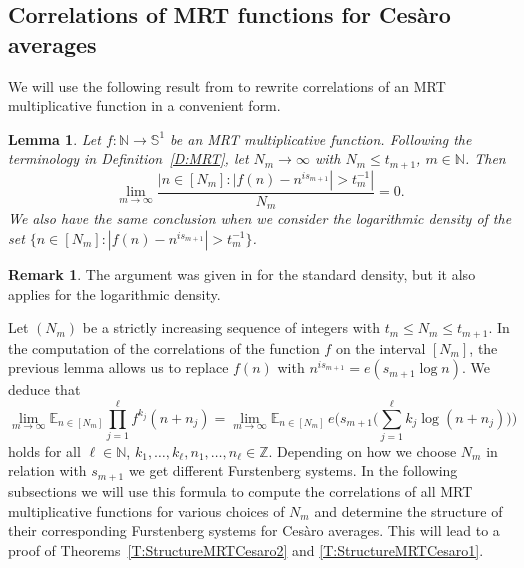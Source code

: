 \documentclass[11pt]{amsart}
\newtheorem{lemma}{Lemma}[section]
\theoremstyle{definition}
\newtheorem*{remark}{Remark}
\newcommand{\E}{{\mathbb E}}
\newcommand{\N}{{\mathbb N}}
\renewcommand{\S}{\mathbb{S}}
\newcommand{\Z}{{\mathbb Z}}
\begin{document}
 	 \subsection{Correlations of MRT functions  for  Ces\`aro averages}\label{SS:Nmsm1}
 	 We will use the following result from
 	 \cite[Lemmas~3.2-3.3]{GLR21} to rewrite correlations of an MRT  multiplicative function in a convenient form.
 	 \begin{lemma}\label{L:MRTreduction}
 	 	Let $f\colon \N\to \S^1$ be an MRT multiplicative function. Following the terminology in Definition~\ref{D:MRT}, let
 	 	 $N_m\to\infty $  with $N_m\leq t_{m+1}$, $m\in\N$. Then
 	 	$$
 	 	\lim_{m\to\infty}   \frac{|n\in [N_m]\colon |f(n)-n^{is_{m+1}}|>t_m^{-1}|}{N_m}=0.
 	 	$$
 	 	We also have the same conclusion  when we consider the logarithmic density of the set $\{n\in [N_m]\colon |f(n)-n^{is_{m+1}}|>t_m^{-1}\}$.
 	 \end{lemma}
  \begin{remark}
  	The argument was given in  \cite{GLR21} for the standard density, but it also applies for the logarithmic density.
  \end{remark}
 	Let  $(N_m)$ be a strictly increasing sequence of integers with $t_m\leq N_m\leq t_{m+1}$.  In the  computation of  the correlations of the function $f$ on the interval $[N_m]$,  the previous lemma  allows us to replace $f(n)$ with $n^{i s_{m+1}}=e(s_{m+1}\log{n})$.
 	 We deduce  that
 	 \begin{equation}\label{E:corrfCes}
 	 	\lim_{m\to \infty}	\E_{n\in[N_m]}\prod_{j=1}^\ell f^{k_j}(n+n_j)=
 	 	\lim_{m\to \infty} 	\E_{n\in[N_m]}\, e\big(s_{m+1}\big(\sum_{j=1}^\ell k_j \log(n+n_j)\big)\big)
 	 \end{equation}
holds   for all $\ell\in\N$, $k_1,\ldots, k_\ell, n_1,\ldots, n_\ell \in \Z$.
 Depending on how we choose $N_m$ in relation with $s_{m+1}$ we get different Furstenberg systems. In the following subsections we will use this formula
   to compute the correlations of all MRT multiplicative functions for various choices of $N_m$ and determine the structure of their corresponding Furstenberg systems for Ces\`aro averages. This will lead to a proof of Theorems~\ref{T:StructureMRTCesaro2} and \ref{T:StructureMRTCesaro1}.
 	
\end{document}
